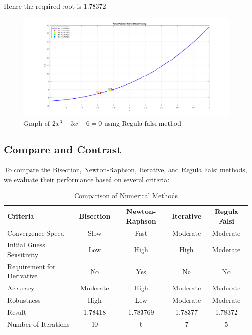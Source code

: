 \documentclass[12pt,a4paper]{article}
\begin{document}
	Hence the required root is 1.78372
	
		\begin{figure}[h]
		
		\includegraphics[width=01\textwidth, ]{four_by_one_false.png} %
		\caption{Graph of $2x^3 - 3x -6 = 0$ using Regula falsi method}
		\label{fig:your_label_here}
	\end{figure}

		\subsection{Compare and Contrast}
		
		To compare the Bisection, Newton-Raphson, Iterative, and Regula Falsi methods, we evaluate their performance based on several criteria:
		
		\begin{table}[h]
			\centering
			\begin{tabular}{lcccc}
				
				\textbf{Criteria} & \textbf{Bisection} & \textbf{Newton-Raphson} & \textbf{Iterative} & \textbf{Regula Falsi} \\
				
				Convergence Speed & Slow & Fast & Moderate & Moderate \\
				Initial Guess Sensitivity & Low & High & High & Moderate \\
				Requirement for Derivative & No & Yes & No & No \\
				Accuracy & Moderate & High & Moderate & Moderate \\
				Robustness & High & Low & Moderate & Moderate \\
				Result & 1.78418 & 1.783769 & 1.78377 & 1.78372 \\
				Number of Iterations & 10 & 6 & 7 & 5 \\
				
			\end{tabular}
			\caption{Comparison of Numerical Methods}
			\label{tab:comparison}
		\end{table}
		
\end{document}
